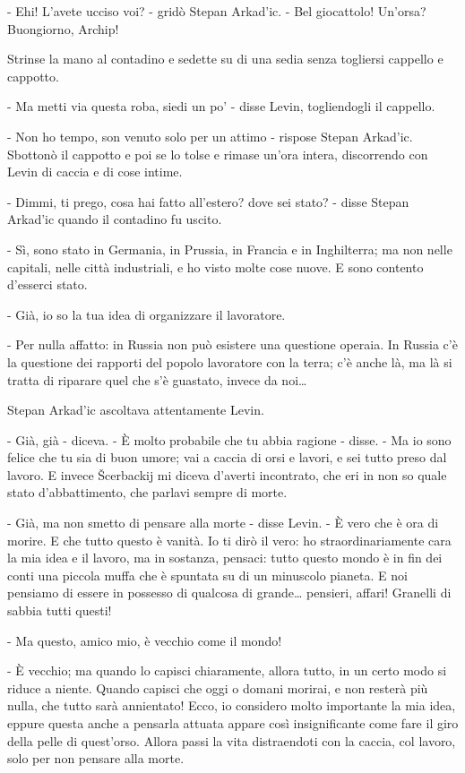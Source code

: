 - Ehi! L'avete ucciso voi? - gridò Stepan Arkad'ic. - Bel giocattolo! Un'orsa? Buongiorno, Archip! 

Strinse la mano al contadino e sedette su di una sedia senza togliersi cappello e cappotto. 

- Ma metti via questa roba, siedi un po' - disse Levin, togliendogli il cappello. 

- Non ho tempo, son venuto solo per un attimo - rispose Stepan Arkad'ic. Sbottonò il cappotto e poi se lo tolse e rimase un'ora intera, discorrendo con Levin di caccia e di cose intime. 

- Dimmi, ti prego, cosa hai fatto all'estero? dove sei stato? - disse Stepan Arkad'ic quando il contadino fu uscito. 

- Sì, sono stato in Germania, in Prussia, in Francia e in Inghilterra; ma non nelle capitali, nelle città industriali, e ho visto molte cose nuove. E sono contento d'esserci stato. 

- Già, io so la tua idea di organizzare il lavoratore. 

- Per nulla affatto: in Russia non può esistere una questione operaia. In Russia c'è la questione dei rapporti del popolo lavoratore con la terra; c'è anche là, ma là si tratta di riparare quel che s'è guastato, invece da noi\ldots{} 

Stepan Arkad'ic ascoltava attentamente Levin. 

- Già, già - diceva. - È molto probabile che tu abbia ragione - disse. - Ma io sono felice che tu sia di buon umore; vai a caccia di orsi e lavori, e sei tutto preso dal lavoro. E invece Šcerbackij mi diceva d'averti incontrato, che eri in non so quale stato d'abbattimento, che parlavi sempre di morte. 

- Già, ma non smetto di pensare alla morte - disse Levin. - È vero che è ora di morire. E che tutto questo è vanità. Io ti dirò il vero: ho straordinariamente cara la mia idea e il lavoro, ma in sostanza, pensaci: tutto questo mondo è in fin dei conti una piccola muffa che è spuntata su di un minuscolo pianeta. E noi pensiamo di essere in possesso di qualcosa di grande\ldots{} pensieri, affari! Granelli di sabbia tutti questi! 

- Ma questo, amico mio, è vecchio come il mondo! 

- È vecchio; ma quando lo capisci chiaramente, allora tutto, in un certo modo si riduce a niente. Quando capisci che oggi o domani morirai, e non resterà più nulla, che tutto sarà annientato! Ecco, io considero molto importante la mia idea, eppure questa anche a pensarla attuata appare così insignificante come fare il giro della pelle di quest'orso. Allora passi la vita distraendoti con la caccia, col lavoro, solo per non pensare alla morte. 

